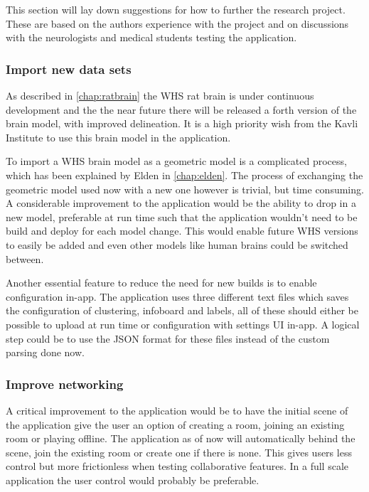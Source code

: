 




This section will lay down suggestions for how to further the research project. These are based on the authors experience with the project and on discussions with the neurologists and medical students testing the application. 

\subsubsection*{Import new data sets}

As described in \autoref{chap:ratbrain} the WHS rat brain is under continuous development and the the near future there will be released a forth version of the brain model, with improved delineation. It is a high priority wish from the Kavli Institute to use this brain model in the application.

To import a WHS brain model as a geometric model is a complicated process, which has been explained by Elden in \autoref{chap:elden}.
The process of exchanging the geometric model used now with a new one however is trivial, but time consuming. A considerable improvement to the application would be the ability to drop in a new model, preferable at run time such that the application wouldn't need to be build and deploy for each model change.
This would enable future WHS versions to easily be added and even other models like human brains could be switched between.  

Another essential feature to reduce the need for new builds is to enable configuration in-app. The application uses three different text files which saves the configuration of clustering, infoboard and labels, all of these should either be possible to upload at run time or configuration with settings UI in-app. A logical step could be to use the JSON format for these files instead of the custom parsing done now.

\subsubsection*{Improve networking}
A critical improvement to the application would be to have the initial scene of the application give the user an option of creating a room, joining an existing room or playing offline.
The application as of now will automatically behind the scene, join the existing room or create one if there is none. This gives users less control but more frictionless when testing collaborative features. In a full scale application the user control would probably be preferable.

